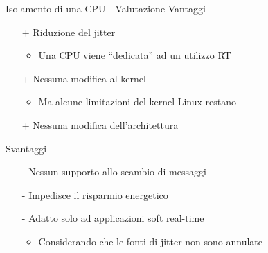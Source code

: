 \begin{frame}{Isolamento di una CPU - Valutazione}
	Vantaggi
	\begin{itemize}
		\item[+] Riduzione del jitter
		\begin{itemize}
			\item Una CPU viene ``dedicata'' ad un utilizzo RT
		\end{itemize}
		\item[+] Nessuna modifica al kernel
		\begin{itemize}
			\item Ma alcune limitazioni del kernel Linux restano
		\end{itemize}
		\item[+] Nessuna modifica dell'architettura
	\end{itemize}
	\vspace{10px}
	Svantaggi
	\begin{itemize}
		\item[-] Nessun supporto allo scambio di messaggi
		\item[-] Impedisce il risparmio energetico
		\item[-] Adatto solo ad applicazioni soft real-time
		\begin{itemize}
			\item Considerando che le fonti di jitter non sono annulate
		\end{itemize}
	\end{itemize}
\end{frame}